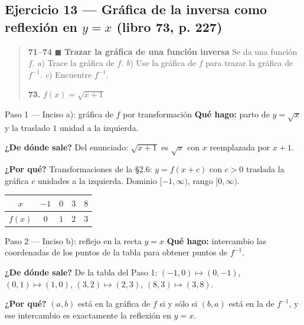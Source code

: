 \documentclass[11pt]{article}
\begin{document}
\subsection*{Ejercicio 13 --- Gráfica de la inversa como reflexión en $y=x$ (libro 73, p. 227)}

\begin{quote}
\textbf{71--74} $\blacksquare$ \textbf{Trazar la gráfica de una función inversa} Se da una función $f$. \textit{a}) Trace la gráfica de $f$. \textit{b}) Use la gráfica de $f$ para trazar la gráfica de $f^{-1}$. \textit{c}) Encuentre $f^{-1}$.

\textbf{73.} $f(x)=\sqrt{x+1}$
\end{quote}

\begin{paso}{Paso 1 --- Inciso a): gráfica de $f$ por transformación}
\textbf{Qué hago:} parto de $y=\sqrt{x}$ y la traslado $1$ unidad a la izquierda.

\textbf{¿De dónde sale?} Del enunciado: $\sqrt{x+1}$ es $\sqrt{x}$ con $x$ reemplazada por $x+1$.

\textbf{¿Por qué?} Transformaciones de la §2.6: $y=f(x+c)$ con $c>0$ traslada la gráfica $c$ unidades a la izquierda. Dominio $[-1,\infty)$, rango $[0,\infty)$.
\begin{center}
\begin{tabular}{|c|c|c|c|c|}
\hline
$x$ & $-1$ & $0$ & $3$ & $8$ \\ \hline
$f(x)$ & $0$ & $1$ & $2$ & $3$ \\ \hline
\end{tabular}
\end{center}
\end{paso}

\begin{paso}{Paso 2 --- Inciso b): reflejo en la recta $y=x$}
\textbf{Qué hago:} intercambio las coordenadas de los puntos de la tabla para obtener puntos de $f^{-1}$.

\textbf{¿De dónde sale?} De la tabla del Paso 1: $(-1,0)\mapsto(0,-1)$, $(0,1)\mapsto(1,0)$, $(3,2)\mapsto(2,3)$, $(8,3)\mapsto(3,8)$.

\textbf{¿Por qué?} $(a,b)$ está en la gráfica de $f$ si y sólo si $(b,a)$ está en la de $f^{-1}$, y ese intercambio es exactamente la reflexión en $y=x$.
\begin{center}
\end{center}
\end{paso}
\end{document}
